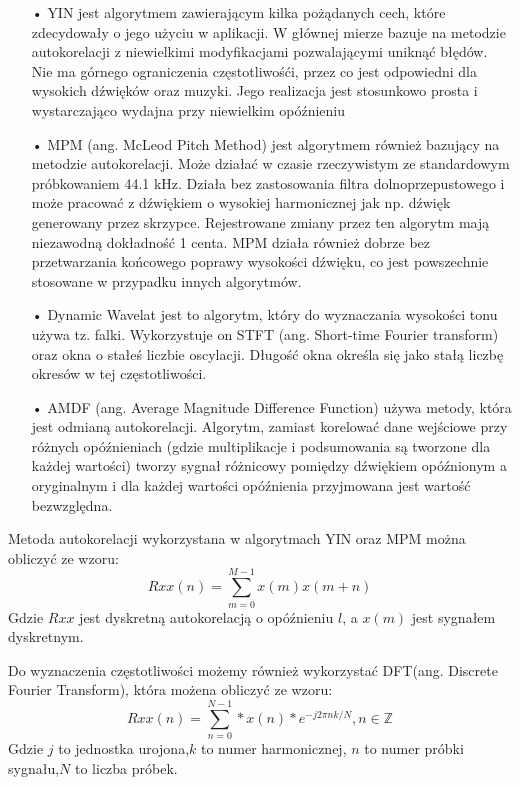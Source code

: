 \begin{itemize}
\item[•]{\cite{YIN}YIN jest algorytmem zawierającym kilka pożądanych cech, które zdecydowały o jego użyciu w aplikacji. W głównej mierze bazuje na metodzie autokorelacji z niewielkimi modyfikacjami pozwalającymi uniknąć błędów. Nie ma górnego ograniczenia częstotliwośći, przez co jest odpowiedni dla wysokich dźwięków oraz muzyki. Jego realizacja jest stosunkowo prosta i wystarczająco wydajna przy niewielkim opóźnieniu}

\item[•]{\cite{harvey}MPM (ang. McLeod Pitch Method) jest algorytmem również bazujący na metodzie autokorelacji. Może działać w czasie rzeczywistym ze standardowym próbkowaniem 44.1 kHz. Działa bez zastosowania filtra dolnoprzepustowego i może pracować z dźwiękiem o wysokiej harmonicznej jak np. dźwięk generowany przez skrzypce. Rejestrowane zmiany przez ten algorytm mają niezawodną dokładność 1 centa. MPM działa również dobrze bez przetwarzania końcowego poprawy wysokości dźwięku, co jest powszechnie stosowane w przypadku innych algorytmów.}

\item[•]{\cite{harvey}Dynamic Wavelat jest to algorytm, który do wyznaczania wysokości tonu używa tz. falki. Wykorzystuje on STFT (ang. Short-time Fourier transform) oraz okna o stałeś liczbie oscylacji. Długość okna określa się jako stałą liczbę okresów w tej częstotliwości.}

\item[•]{\cite{AMDF} AMDF (ang. Average  Magnitude Difference Function) używa metody, która jest odmianą autokorelacji. Algorytm, zamiast korelować dane wejściowe przy różnych opóźnieniach (gdzie multiplikacje i podsumowania są tworzone dla każdej wartości) tworzy sygnał różnicowy pomiędzy dźwiękiem opóźnionym a oryginalnym i dla każdej wartości opóźnienia przyjmowana jest wartość bezwzględna.}

\end{itemize}
 


Metoda autokorelacji wykorzystana w algorytmach YIN oraz MPM można obliczyć ze wzoru:
\begin{equation}
\label{equation:2}
   Rxx(n) = \sum_{m=0}^{M-1}{x(m)x(m+n)}
\end{equation}
Gdzie $Rxx$ jest dyskretną autokorelacją o opóźnieniu $l$, a $x(m)$ jest sygnałem dyskretnym.

Do wyznaczenia częstotliwości możemy również wykorzystać DFT(ang. Discrete Fourier Transform), która możena obliczyć ze wzoru:
\begin{equation}
\label{equation:3}
   Rxx(n) = \sum_{n=0}^{N-1}*{x(n)}*e^{-{j2 \pi nk}/{N }},  n \in{\mathbb{Z}}
\end{equation}
Gdzie $j$ to jednostka urojona,$k$ to numer harmonicznej, $n$ to numer próbki sygnału,$N$ to liczba próbek.



